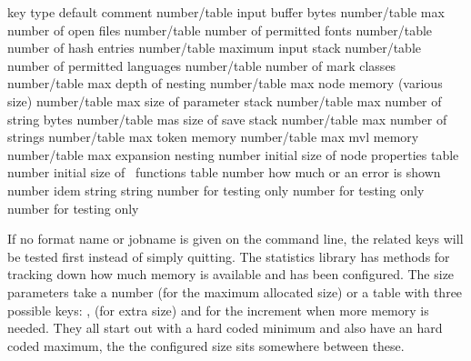 \starttabulate[|l|l|l|l|]
\FL
\BC key                       \BC type         \BC default  \BC comment \NC \NR
\TL
\NC {}        \NC number/table  \NC input buffer bytes \NC \NR
\NC {}          \NC number/table  \NC max number of open files \NC \NR
\NC {}          \NC number/table  \NC number of permitted fonts \NC \NR
\NC {}          \NC number/table  \NC number of hash entries \NC \NR
\NC {}         \NC number/table  \NC maximum input stack \NC \NR
\NC {}      \NC number/table  \NC number of permitted languages \NC \NR
\NC {}          \NC number/table  \NC number of mark classes \NC \NR
\NC {}          \NC number/table  \NC max depth of nesting \NC \NR
\NC {}          \NC number/table  \NC max node memory (various size) \NC \NR
\NC {}     \NC number/table  \NC max size of parameter stack \NC \NR
\NC {}          \NC number/table  \NC max number of string bytes \NC \NR
\NC {}          \NC number/table  \NC mas size of save stack \NC \NR
\NC {}        \NC number/table  \NC max number of strings \NC \NR
\NC {}         \NC number/table  \NC max token memory \NC \NR
\NC {}           \NC number/table  \NC max mvl memory \NC \NR
\ML
\NC {}        \NC number/table  \NC max expansion nesting \NC \NR
\NC {}    \NC number        \NC initial size of node properties table \NC \NR
\NC {}      \NC number        \NC initial size of \LUA\ functions table \NC \NR
\NC {}     \NC number        \NC how much or an error is shown \NC \NR
\NC {} \NC number        \NC idem \NC \NR
\ML
\NC {}        \NC string       \NC          \NC \NC \NR
\NC {}           \NC string       \NC          \NC \NC \NR
\ML
\NC {}         \NC number       \NC          \NC for testing only \NC \NR
\NC {}        \NC number       \NC          \NC for testing only \NC \NR
\NC {}     \NC number       \NC          \NC for testing only \NC \NR
\LL
\stoptabulate

If no format name or jobname is given on the command line, the related keys will
be tested first instead of simply quitting. The statistics library has methods
for tracking down how much memory is available and has been configured. The size
parameters take a number (for the maximum allocated size) or a table with three
possible keys: ,  (for extra size) and  for
the increment when more memory is needed. They all start out with a hard coded
minimum and also have an hard coded maximum, the the configured size sits
somewhere between these.

